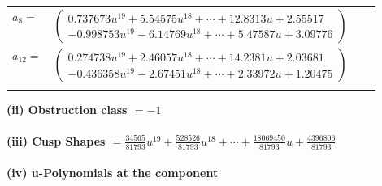 \documentclass[1p]{elsarticle_modified}
\theoremstyle{definition}
\begin{document}
\begin{tabular}{m{7pt} m{180pt} m{7pt} m{180pt} }
\flushright $a_{8}=$&$\begin{pmatrix}0.737673 u^{19}+5.54575 u^{18}+\cdots+12.8313 u+2.55517\\-0.998753 u^{19}-6.14769 u^{18}+\cdots+5.47587 u+3.09776\end{pmatrix}$ \\
\flushright $a_{12}=$&$\begin{pmatrix}0.274738 u^{19}+2.46057 u^{18}+\cdots+14.2381 u+2.03681\\-0.436358 u^{19}-2.67451 u^{18}+\cdots+2.33972 u+1.20475\end{pmatrix}$\\&\end{tabular}
\flushleft \textbf{(ii) Obstruction class $= -1$}\\~\\
\flushleft \textbf{(iii) Cusp Shapes $= \frac{34565}{81793} u^{19}+\frac{528526}{81793} u^{18}+\cdots+\frac{18069450}{81793} u+\frac{4396806}{81793}$}\\~\\
\newpage\renewcommand{\arraystretch}{1}
\flushleft \textbf{(iv) u-Polynomials at the component}\newline \\
\end{document}
